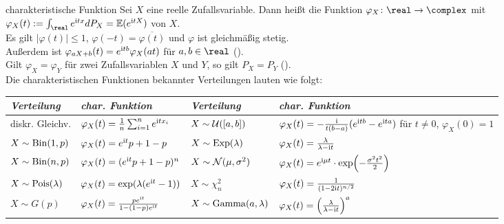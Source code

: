 \begin{Def}{charakteristische Funktion}
    Sei $X$ eine reelle Zufallsvariable.
    Dann heißt die Funktion $\varphi_X\colon \real \rightarrow \complex$ mit
    $\varphi_X(t) := \int_\real e^{\i tx} dP_X = \EE(e^{\i tX})$
     von $X$.\\
    Es gilt $|\varphi(t)| \le 1$, $\varphi(-t) = \overline{\varphi(t)}$ und $\varphi$ ist
    gleichmäßig stetig.\\
    Außerdem ist $\varphi_{aX+b}(t) = e^{\mathrm{i} tb} \varphi_X(at)$ für $a, b \in \real$
    ().\\
    Gilt $\varphi_X = \varphi_Y$ für zwei Zufallsvariablen $X$ und $Y$, so gilt $P_X = P_Y$
    ().\\
    Die charakteristischen Funktionen bekannter Verteilungen lauten wie folgt:

    {\small
    \begin{tabular}{p{25mm}p{46mm}p{35mm}p{45mm}}
        \toprule
        \emph{Verteilung} & \emph{char. Funktion} &
        \emph{Verteilung} & \emph{char. Funktion}\\

        \midrule
        diskr. Gleichv. &
        $\varphi_X(t) = \frac{1}{n} \sum_{i=1}^n e^{\mathrm{i} tx_i}$ &
        $X \sim \mathcal{U}([a, b])$ &
        $\varphi_X(t) = -\frac{\mathrm{i}}{t(b-a)} (e^{\mathrm{i} tb} - e^{\mathrm{i} ta})$ für $t \not= 0$,
        $\varphi_X(0) = 1$\\

        \midrule
        $X \sim \operatorname{Bin}(1, p)$ &
        $\varphi_X(t) = e^{\mathrm{i} t} p + 1 - p$ &
        $X \sim \operatorname{Exp}(\lambda)$ &
        $\varphi_X(t) = \frac{\lambda}{\lambda - \mathrm{i} t}$\\

        \midrule
        $X \sim \operatorname{Bin}(n, p)$ &
        $\varphi_X(t) = (e^{\mathrm{i} t} p + 1 - p)^n$ &
        $X \sim \mathcal{N}(\mu, \sigma^2)$ &
        $\varphi_X(t) = e^{\mathrm{i} \mu t} \cdot \exp\!\left(-\frac{\sigma^2 t^2}{2}\right)$\\

        \midrule
        $X \sim \operatorname{Pois}(\lambda)$ &
        $\varphi_X(t) = \exp(\lambda(e^{\mathrm{i} t} - 1))$ &
        $X \sim \chi_n^2$ &
        $\varphi_X(t) = \frac{1}{(1 - 2\mathrm{i} t)^{n/2}}$\\

        \midrule
        $X \sim G(p)$  &
        $\varphi_X(t) = \frac{p e^{\mathrm{i} t}}{1 - (1 - p)e^{\mathrm{i} t}}$ &
        $X \sim \operatorname{Gamma}(a, \lambda)$ &
        $\varphi_X(t) = \left(\frac{\lambda}{\lambda - \mathrm{i} t}\right)^a$\\

        \bottomrule
    \end{tabular}}
\end{Def}

